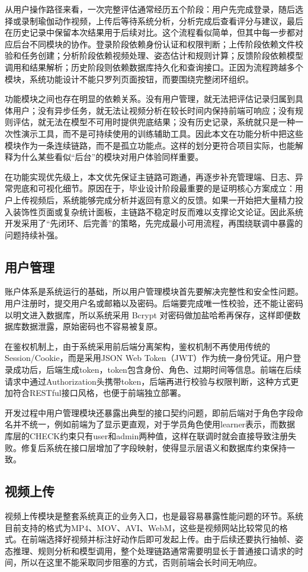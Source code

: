 \documentclass[UTF8,twoside]{ctexrep}
\makeatletter
\def@NAT@last@yr{\@citea}%
\def@NAT@last@yr{-\NAT@penalty}%
\makeatother
\begin{document}
从用户操作路径来看，一次完整评估通常经历五个阶段：用户先完成登录，随后选择或录制瑜伽动作视频，上传后等待系统分析，分析完成后查看评分与建议，最后在历史记录中保留本次结果用于后续对比。这个流程看似简单，但其中每一步都对应后台不同模块的协作。登录阶段依赖身份认证和权限判断；上传阶段依赖文件校验和任务创建；分析阶段依赖视频处理、姿态估计和规则计算；反馈阶段依赖模型调用和结果解析；历史阶段则依赖数据库持久化和查询接口。正因为流程跨越多个模块，系统功能设计不能只罗列页面按钮，而要围绕完整闭环组织。

功能模块之间也存在明显的依赖关系。没有用户管理，就无法把评估记录归属到具体用户；没有异步任务，就无法让视频分析在较长时间内保持前端可响应；没有规则评估，就无法在模型不可用时提供兜底结果；没有历史记录，系统就只是一种一次性演示工具，而不是可持续使用的训练辅助工具。因此本文在功能分析中把这些模块作为一条连续链路，而不是孤立功能点。这样的划分更符合项目实际，也能解释为什么某些看似“后台”的模块对用户体验同样重要。

在功能实现优先级上，本文优先保证主链路可跑通，再逐步补充管理端、日志、异常兜底和可视化细节。原因在于，毕业设计阶段最重要的是证明核心方案成立：用户上传视频后，系统能够完成分析并返回有意义的反馈。如果一开始把大量精力投入装饰性页面或复杂统计面板，主链路不稳定时反而难以支撑论文论证。因此系统开发采用了“先闭环、后完善”的策略，先完成最小可用流程，再围绕联调中暴露的问题持续补强。

\subsection{用户管理}
账户体系是系统运行的基础，所以用户管理模块首先要解决完整性和安全性问题。用户注册时，提交用户名或邮箱以及密码。后端要完成唯一性校验，还不能让密码以明文进入数据库，所以系统采用 Bcrypt 对密码做加盐哈希再保存，这样即便数据库数据泄露，原始密码也不容易被复原。

在鉴权机制上，由于系统采用前后端分离架构，鉴权机制不再使用传统的Session/Cookie，而是采用JSON Web Token（JWT）\cite{ref_jwt}作为统一身份凭证。用户登录成功后，后端生成token，token包含身份、角色、过期时间等信息。前端在后续请求中通过Authorization头携带token，后端再进行校验与权限判断，这种方式更加符合RESTful接口风格，也便于前端独立部署。

开发过程中用户管理模块还暴露出典型的接口契约问题，即前后端对于角色字段命名并不统一，例如前端为了显示更直观，对于学员角色使用learner表示，而数据库层的CHECK约束只有user和admin两种值，这样在联调时就会直接导致注册失败。修复后系统在接口层增加了字段映射，使得显示层语义和数据库约束保持一致。

\subsection{视频上传}
视频上传模块是整套系统真正的业务入口，也是最容易暴露性能问题的环节。系统目前支持的格式为MP4、MOV、AVI、WebM，这些是视频网站比较常见的格式。在前端选择好视频并标注好动作后即可发起上传。由于后续还要执行抽帧、姿态推理、规则分析和模型调用，整个处理链路通常需要明显长于普通接口请求的时间，所以在这里不能采取同步阻塞的方式，否则前端会长时间无响应。
\end{document}

